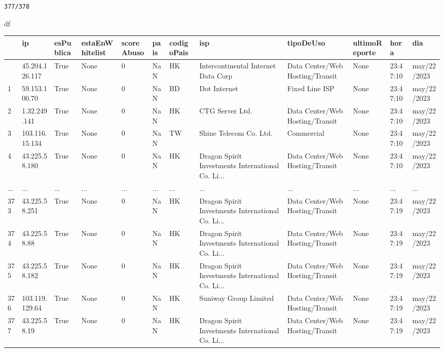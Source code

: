 \documentclass[
  letterpaper,
  DIV=11,
  numbers=noendperiod]{scrartcl}
\newenvironment{Shaded}{\begin{snugshade}}{\end{snugshade}}
\newcommand{\NormalTok}[1]{\textcolor[rgb]{0.00,0.23,0.31}{#1}}
\begin{document}
\begin{verbatim}
377/378
\end{verbatim}

\begin{Shaded}
\begin{Highlighting}[]
\NormalTok{df}
\end{Highlighting}
\end{Shaded}

\begin{longtable}[]{@{}llllllllllll@{}}
\toprule\noalign{}
& ip & esPublica & estaEnWhitelist & scoreAbuso & pais & codigoPais &
isp & tipoDeUso & ultimoReporte & hora & dia \\
\midrule\noalign{}
\endhead
\bottomrule\noalign{}
\endlastfoot
0 & 45.204.126.117 & True & None & 0 & NaN & HK & Intercontinental
Internet Data Corp & Data Center/Web Hosting/Transit & None & 23:47:10 &
may/22/2023 \\
1 & 59.153.100.70 & True & None & 0 & NaN & BD & Dot Internet & Fixed
Line ISP & None & 23:47:10 & may/22/2023 \\
2 & 1.32.249.141 & True & None & 0 & NaN & HK & CTG Server Ltd. & Data
Center/Web Hosting/Transit & None & 23:47:10 & may/22/2023 \\
3 & 103.116.15.134 & True & None & 0 & NaN & TW & Shine Telecom Co. Ltd.
& Commercial & None & 23:47:10 & may/22/2023 \\
4 & 43.225.58.180 & True & None & 0 & NaN & HK & Dragon Spirit
Investments International Co. Li... & Data Center/Web Hosting/Transit &
None & 23:47:10 & may/22/2023 \\
... & ... & ... & ... & ... & ... & ... & ... & ... & ... & ... & ... \\
373 & 43.225.58.251 & True & None & 0 & NaN & HK & Dragon Spirit
Investments International Co. Li... & Data Center/Web Hosting/Transit &
None & 23:47:19 & may/22/2023 \\
374 & 43.225.58.88 & True & None & 0 & NaN & HK & Dragon Spirit
Investments International Co. Li... & Data Center/Web Hosting/Transit &
None & 23:47:19 & may/22/2023 \\
375 & 43.225.58.182 & True & None & 0 & NaN & HK & Dragon Spirit
Investments International Co. Li... & Data Center/Web Hosting/Transit &
None & 23:47:19 & may/22/2023 \\
376 & 103.119.129.64 & True & None & 0 & NaN & HK & Suniway Group
Limited & Data Center/Web Hosting/Transit & None & 23:47:19 &
may/22/2023 \\
377 & 43.225.58.19 & True & None & 0 & NaN & HK & Dragon Spirit
Investments International Co. Li... & Data Center/Web Hosting/Transit &
None & 23:47:19 & may/22/2023 \\
\end{longtable}
\end{document}
